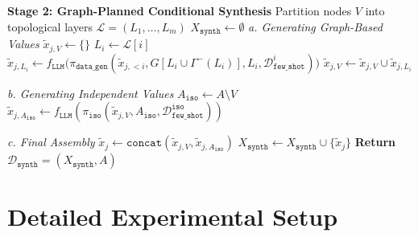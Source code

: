 \begin{algorithm*}
\begin{algorithmic}[1]
\vspace{0.3cm}

\Statex \textbf{Stage 2: Graph-Planned Conditional Synthesis}
\State Partition nodes $V$ into topological layers $\mathcal{L} = (L_1, \dots, L_m)$
\State $X_{\mathtt{synth}} \gets \emptyset$
    \Statex \hspace{\algorithmicindent} \textit{a. Generating Graph-Based Values}
    \State $\tilde{x}_{j,V} \gets \{\}$
        \State $L_i \gets \mathcal{L}[i]$
        \State $\tilde{x}_{j,L_i} \gets f_{\mathtt{LLM}}\Big(\pi_{\mathtt{data\_gen}}(\tilde{x}_{j,<i}, G[L_i \cup \Gamma^-(L_i)], L_i, \mathcal{D}_{\mathtt{few\_shot}}^i)\Big)$
        \State $\tilde{x}_{j,V} \gets \tilde{x}_{j,V} \cup \tilde{x}_{j,L_i}$
    \EndFor
    
    \Statex \hspace{\algorithmicindent} \textit{b. Generating Independent Values}
    \State $A_{\mathtt{iso}} \gets A \setminus V$
    \State $\tilde{x}_{j, A_{\mathtt{iso}}} \gets f_{\mathtt{LLM}}(\pi_{\mathtt{iso}}(\tilde{x}_{j,V}, A_{\mathtt{iso}}, \mathcal{D}_{\mathtt{few\_shot}}^{\mathtt{iso}}))$
    
    \Statex \hspace{\algorithmicindent} \textit{c. Final Assembly}
    \State $\tilde{x}_j \gets \mathtt{concat}(\tilde{x}_{j,V}, \tilde{x}_{j,A_{\mathtt{iso}}})$
    \State $X_{\mathtt{synth}} \gets X_{\mathtt{synth}} \cup \{\tilde{x}_j\}$
\EndFor
\State \textbf{Return} $\mathcal{D}_{\mathtt{synth}} = (X_{\mathtt{synth}}, A)$
\end{algorithmic}
\end{algorithm*}

\section{Detailed Experimental Setup}
\label{app:detailed_experimental_setup}

